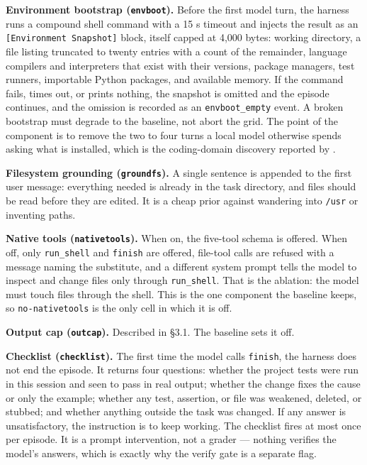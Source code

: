 \documentclass[
  10pt,
  a4paper,
]{article}
\let\oldtexttt\texttt
\renewcommand{\texttt}[1]{{\small\oldtexttt{#1}}}
\begin{document}
\textbf{Environment bootstrap (\texttt{envboot}).} Before the first
model turn, the harness runs a compound shell command with a 15 s
timeout and injects the result as an
\texttt{{[}Environment\ Snapshot{]}} block, itself capped at 4,000
bytes: working directory, a file listing truncated to twenty entries
with a count of the remainder, language compilers and interpreters that
exist with their versions, package managers, test runners, importable
Python packages, and available memory. If the command fails, times out,
or prints nothing, the snapshot is omitted and the episode continues,
and the omission is recorded as an \texttt{envboot\_empty} event. A
broken bootstrap must degrade to the baseline, not abort the grid. The
point of the component is to remove the two to four turns a local model
otherwise spends asking what is installed, which is the coding-domain
discovery reported by \citet[App. B.3]{lee2026metaharness}.

\textbf{Filesystem grounding (\texttt{groundfs}).} A single sentence is
appended to the first user message: everything needed is already in the
task directory, and files should be read before they are edited. It is a
cheap prior against wandering into \texttt{/usr} or inventing paths.

\textbf{Native tools (\texttt{nativetools}).} When on, the five-tool
schema is offered. When off, only \texttt{run\_shell} and
\texttt{finish} are offered, file-tool calls are refused with a message
naming the substitute, and a different system prompt tells the model to
inspect and change files only through \texttt{run\_shell}. That is the
ablation: the model must touch files through the shell. This is the one
component the baseline keeps, so \texttt{no-nativetools} is the only
cell in which it is off.

\textbf{Output cap (\texttt{outcap}).} Described in §3.1. The baseline
sets it off.

\textbf{Checklist (\texttt{checklist}).} The first time the model calls
\texttt{finish}, the harness does not end the episode. It returns four
questions: whether the project tests were run in this session and seen
to pass in real output; whether the change fixes the cause or only the
example; whether any test, assertion, or file was weakened, deleted, or
stubbed; and whether anything outside the task was changed. If any
answer is unsatisfactory, the instruction is to keep working. The
checklist fires at most once per episode. It is a prompt intervention,
not a grader --- nothing verifies the model's answers, which is exactly
why the verify gate is a separate flag.
\end{document}
